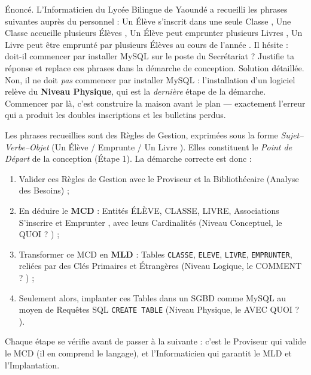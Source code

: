 \documentclass[11pt]{article}
\newcommand{\cle}[1]{{\popxbold\color{popdark}#1}}
\begin{document}
\begin{exoresolu}
Énoncé. L'Informaticien du Lycée Bilingue de Yaoundé a recueilli les phrases suivantes auprès du personnel : \og Un Élève s'inscrit dans une seule Classe \fg{}, \og Une Classe accueille plusieurs Élèves \fg{}, \og Un Élève peut emprunter plusieurs Livres \fg{}, \og Un Livre peut être emprunté par plusieurs Élèves au cours de l'année \fg{}. Il hésite : doit-il commencer par installer MySQL sur le poste du Secrétariat ? Justifie ta réponse et replace ces phrases dans la démarche de conception.
\tcblower
Solution détaillée. Non, il ne doit \emph{pas} commencer par installer MySQL : l'installation d'un logiciel relève du \textbf{Niveau Physique}, qui est la \emph{dernière} étape de la démarche. Commencer par là, c'est construire la maison avant le plan — exactement l'erreur qui a produit les doubles inscriptions et les bulletins perdus.

Les phrases recueillies sont des \cle{Règles de Gestion}, exprimées sous la forme \emph{Sujet--Verbe--Objet} (\og Un Élève \fg{} / \og Emprunte \fg{} / \og Un Livre \fg{}). Elles constituent le \emph{Point de Départ} de la conception (Étape 1). La démarche correcte est donc :
\begin{enumerate}
\item Valider ces Règles de Gestion avec le Proviseur et la Bibliothécaire (Analyse des Besoins) ;
\item En déduire le \textbf{MCD} : Entités ÉLÈVE, CLASSE, LIVRE, Associations \og S'inscrire \fg{} et \og Emprunter \fg{}, avec leurs Cardinalités (Niveau Conceptuel, le \og QUOI ? \fg{}) ;
\item Transformer ce MCD en \textbf{MLD} : Tables \texttt{CLASSE}, \texttt{ELEVE}, \texttt{LIVRE}, \texttt{EMPRUNTER}, reliées par des Clés Primaires et Étrangères (Niveau Logique, le \og COMMENT ? \fg{}) ;
\item Seulement alors, implanter ces Tables dans un SGBD comme MySQL au moyen de Requêtes SQL \texttt{CREATE TABLE} (Niveau Physique, le \og AVEC QUOI ? \fg{}).
\end{enumerate}
Chaque étape se vérifie avant de passer à la suivante : c'est le Proviseur qui valide le MCD (il en comprend le langage), et l'Informaticien qui garantit le MLD et l'Implantation.
\end{exoresolu}
\end{document}
